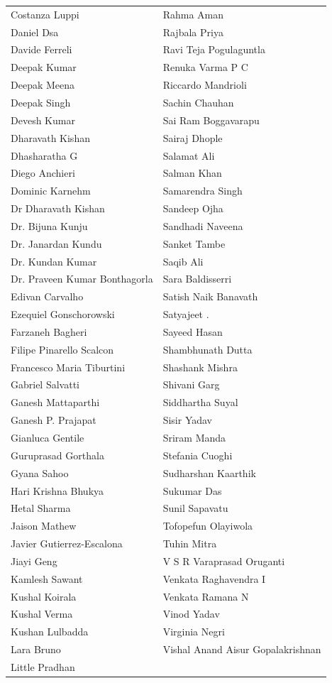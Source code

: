 \begin{longtable}{ll}
		Costanza Luppi & Rahma Aman \\  
		Daniel Dsa & Rajbala Priya \\  
		Davide Ferreli & Ravi Teja Pogulaguntla \\  
		Deepak Kumar & Renuka Varma P C \\  
		Deepak Meena & Riccardo Mandrioli \\  
		Deepak Singh & Sachin Chauhan \\  
		Devesh Kumar & Sai Ram Boggavarapu \\  
		Dharavath Kishan & Sairaj Dhople \\  
		Dhasharatha G & Salamat Ali \\  
		Diego Anchieri & Salman Khan \\  
		Dominic Karnehm & Samarendra Singh \\  
		Dr Dharavath Kishan & Sandeep Ojha \\  
		Dr. Bijuna Kunju & Sandhadi Naveena \\  
		Dr. Janardan Kundu & Sanket Tambe \\  
		Dr. Kundan Kumar & Saqib Ali \\  
		Dr. Praveen Kumar Bonthagorla & Sara Baldisserri \\  
		Edivan Carvalho & Satish Naik Banavath \\  
		Ezequiel Gonschorowski & Satyajeet . \\  
		Farzaneh Bagheri & Sayeed Hasan \\  
		Filipe Pinarello Scalcon & Shambhunath Dutta \\  
		Francesco Maria Tiburtini & Shashank Mishra \\  
		Gabriel Salvatti & Shivani Garg \\  
		Ganesh Mattaparthi & Siddhartha Suyal \\  
		Ganesh P. Prajapat & Sisir Yadav \\  
		Gianluca Gentile & Sriram Manda \\  
		Guruprasad Gorthala & Stefania Cuoghi \\  
		Gyana Sahoo & Sudharshan Kaarthik \\  
		Hari Krishna Bhukya & Sukumar Das \\  
		Hetal Sharma & Sunil Sapavatu \\  
		Jaison Mathew & Tofopefun Olayiwola \\  
		Javier Gutierrez-Escalona & Tuhin Mitra \\  
		Jiayi Geng & V S R Varaprasad Oruganti \\  
		Kamlesh Sawant & Venkata Raghavendra I \\  
		Kushal Koirala & Venkata Ramana N \\  
		Kushal Verma & Vinod Yadav \\  
		Kushan Lulbadda & Virginia Negri \\  
		Lara Bruno & Vishal Anand Aisur Gopalakrishnan \\  
		Little Pradhan & ~ \\  
	\end{longtable}